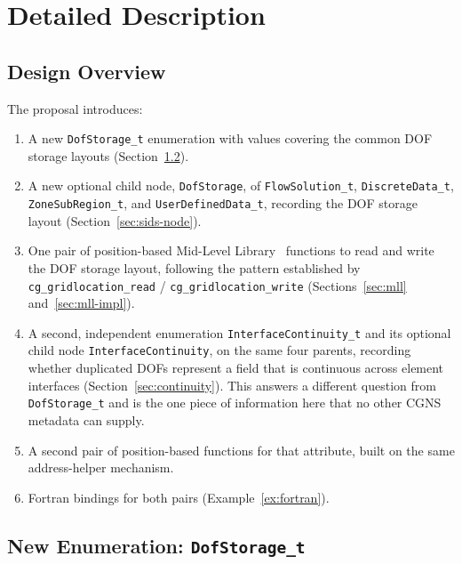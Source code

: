 \documentclass[11pt,letterpaper]{article}
\begin{document}
\section{Detailed Description}

\subsection{Design Overview}

The proposal introduces:

\begin{enumerate}[leftmargin=2em]
\item A new \texttt{DofStorage\_t} enumeration with values
  covering the common DOF storage layouts
  (Section~\ref{sec:enum}).
\item A new optional child node, \texttt{DofStorage}, of
  \texttt{FlowSolution\_t}, \texttt{DiscreteData\_t},
  \texttt{ZoneSubRegion\_t}, and \texttt{UserDefinedData\_t},
  recording the DOF storage layout
  (Section~\ref{sec:sids-node}).
\item One pair of position-based Mid-Level Library~\cite{cgns-mll}
  functions to read and
  write the DOF storage layout, following the pattern established by
  \texttt{cg\_gridlocation\_read} / \texttt{cg\_gridlocation\_write}
  (Sections~\ref{sec:mll} and~\ref{sec:mll-impl}).
\item A second, independent enumeration
  \texttt{InterfaceContinuity\_t} and its optional child node
  \texttt{InterfaceContinuity}, on the same four parents, recording
  whether duplicated DOFs represent a field that is continuous across
  element interfaces (Section~\ref{sec:continuity}).  This answers a
  different question from \texttt{DofStorage\_t} and is the one piece of
  information here that no other CGNS metadata can supply.
\item A second pair of position-based functions for that attribute,
  built on the same address-helper mechanism.
\item Fortran bindings for both pairs (Example~\ref{ex:fortran}).
\end{enumerate}

\subsection{New Enumeration: \texttt{DofStorage\_t}}
\label{sec:enum}
\end{document}

